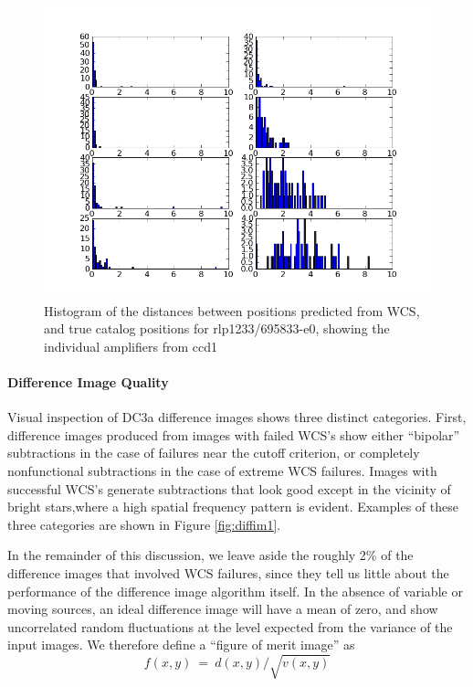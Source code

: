 \begin{figure}[htb]
\begin{center}
\includegraphics[width=6in]{images/rlp1233_ccd1_match.png}
\caption{Histogram of the distances between positions predicted from WCS, and
  true catalog positions for rlp1233/695833-e0, showing the individual
amplifiers from ccd1}  
\label{fig:wcs2}
\end{center}
\end{figure}



\paragraph{Difference Image Quality}

Visual inspection of DC3a difference images shows three distinct
categories. First, difference images produced from images with failed 
WCS's show either ``bipolar'' subtractions in the case of failures
near the cutoff criterion, or completely nonfunctional subtractions in
the case of extreme WCS failures.  Images with successful WCS's
generate subtractions that look good except in the vicinity of bright
stars,where a high spatial frequency pattern is evident.  Examples of
these three categories are shown in Figure \ref{fig:diffim1}.

In the remainder of this discussion, we leave aside the roughly 2\% of
the difference images that involved WCS failures, since they tell us
little about the performance of the difference image algorithm itself.
In the absence of variable or moving sources, an ideal difference
image will have a mean of zero, and show uncorrelated random
fluctuations at the level expected from the variance of the input
images.  We therefore define a ``figure of merit image'' as
\begin{equation}
f(x,y)~=~d(x,y)/\sqrt {v(x,y)}
\end{equation} 

